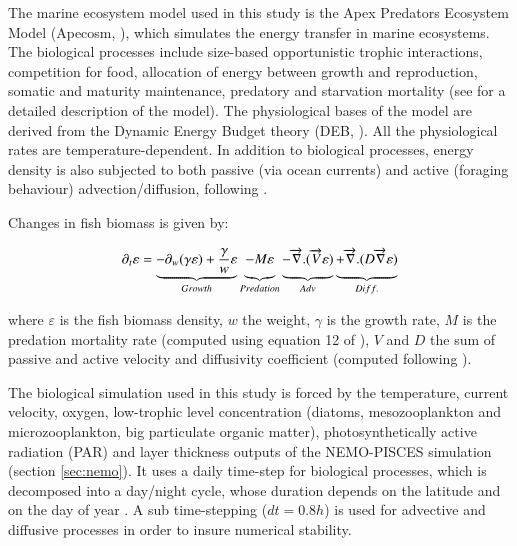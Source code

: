 The marine ecosystem model used in this study is the Apex Predators Ecosystem Model (Apecosm, \citealt{mauryModelingEnvironmentalEffects2007, mauryOverviewAPECOSMSpatialized2010}), which simulates the energy transfer in marine ecosystems. The biological processes include size-based opportunistic trophic interactions, competition for food, allocation of energy between growth and reproduction, somatic and maturity maintenance, predatory and starvation mortality (see \citealt{mauryModelingEnvironmentalEffects2007} for a detailed description of the model). The physiological bases of the model are derived from the Dynamic Energy Budget theory (DEB, \citealt{kooijmanDynamicEnergyMass2000}). All the physiological rates are temperature-dependent. In addition to biological processes, energy density is also subjected to both passive (via ocean currents) and active (foraging behaviour) advection/diffusion, following \cite{faugerasAdvectiondiffusionreactionSizestructuredFish2005}.

Changes in fish biomass is given by:

\begin{equation}
\partial_t \varepsilon = \underbrace{- \partial_w(\gamma \varepsilon) + \frac{\gamma}{w}\varepsilon}_{Growth} 
\underbrace{- M \varepsilon \vphantom{\frac{\gamma}{w}\varepsilon}}_{Predation}
\underbrace{-\overrightarrow{\nabla}.(\overrightarrow{V} \varepsilon) \vphantom{\frac{\gamma}{w}\varepsilon}}_{Adv} 
\underbrace{+ \overrightarrow{\nabla} . (D \overrightarrow{\nabla} \varepsilon) \vphantom{\frac{\gamma}{w}\varepsilon}}_{Diff.}
\label{eq:apecosm_trend}
\end{equation}

where $\varepsilon$  is the fish biomass density, $w$ the weight, $\gamma$ is the growth rate, $M$ is the predation mortality rate (computed using equation 12 of \citealt{mauryIndividualsPopulationsCommunities2013}), $V$ and $D$ the sum of passive and active velocity and diffusivity coefficient (computed following \citealt{faugerasAdvectiondiffusionreactionSizestructuredFish2005}).

The biological simulation used in this study is forced by the temperature, current velocity, oxygen, low-trophic level concentration (diatoms, mesozooplankton and microzooplankton, big particulate organic matter), photosynthetically active radiation (PAR) and layer thickness outputs of the NEMO-PISCES simulation (section \ref{sec:nemo}). It uses a daily time-step for biological processes, which is decomposed into a day/night cycle, whose duration depends on the latitude and on the day of year \citep{forsytheModelComparisonDaylength1995}. A sub time-stepping ($dt =0.8h$) is used for advective and diffusive processes in order to insure numerical stability.

